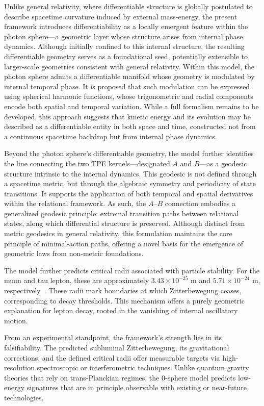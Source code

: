 \documentclass[%
 reprint,
 amsmath,amssymb,
 aps,
]{revtex4-1}
\numberwithin{equation}{section}%
\begin{document}
Unlike general relativity, where differentiable structure is globally postulated to describe spacetime curvature induced by external mass-energy, the present framework introduces differentiability as a locally emergent feature within the photon sphere—a geometric layer whose structure arises from internal phase dynamics. Although initially confined to this internal structure, the resulting differentiable geometry serves as a foundational seed, potentially extensible to larger-scale geometries consistent with general relativity. Within this model, the photon sphere admits a differentiable manifold whose geometry is modulated by internal temporal phase. It is proposed that such modulation can be expressed using spherical harmonic functions, whose trigonometric and radial components encode both spatial and temporal variation. While a full formalism remains to be developed, this approach suggests that kinetic energy and its evolution may be described as a differentiable entity in both space and time, constructed not from a continuous spacetime backdrop but from internal phase dynamics.

Beyond the photon sphere's differentiable geometry, the model further identifies the line connecting the two TPE kernels—designated $A$ and $B$---as a geodesic structure intrinsic to the internal dynamics. This geodesic is not defined through a spacetime metric, but through the algebraic symmetry and periodicity of state transitions. It supports the application of both temporal and spatial derivatives within the relational framework. As such, the $A$–$B$ connection embodies a generalized geodesic principle: extremal transition paths between relational states, along which differential structure is preserved. Although distinct from metric geodesics in general relativity, this formulation maintains the core principle of minimal-action paths, offering a novel basis for the emergence of geometric laws from non-metric foundations.

The model further predicts critical radii associated with particle stability. For the muon and tau lepton, these are approximately $3.43 \times 10^{-25}$ m and $5.71 \times 10^{-24}$ m, respectively~\cite{hanamura2501.0130}. These radii mark boundaries at which Zitterbewegung ceases, corresponding to decay thresholds. This mechanism offers a purely geometric explanation for lepton decay, rooted in the vanishing of internal oscillatory motion.

From an experimental standpoint, the framework's strength lies in its falsifiability. The predicted subluminal Zitterbewegung, its gravitational corrections, and the defined critical radii offer measurable targets via high-resolution spectroscopic or interferometric techniques. Unlike quantum gravity theories that rely on trans-Planckian regimes, the 0-sphere model predicts low-energy signatures that are in principle observable with existing or near-future technologies.
\end{document}
